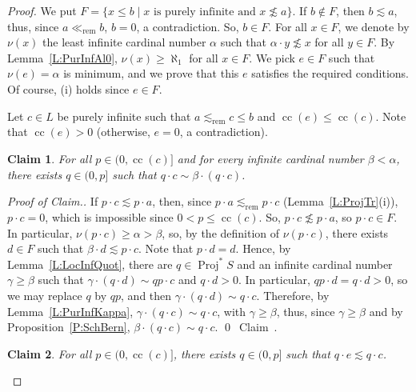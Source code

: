 \documentclass[psamsfonts,reqno]{memo-l}
\theoremstyle{plain}
\newtheorem{claim}{Claim}
\theoremstyle{definition}
\theoremstyle{remark}
\newcommand{\qedc}{{\qed}~{\rm Claim~{\theclaim}.}}
\newenvironment{cproof}
{\begin{proof}[Proof of Claim.]}
{\qedc\renewcommand{\qed}{}\end{proof}}
\numberwithin{equation}{section}
\newcommand{\rem}{\ll_{\mathrm{rem}}}
\newcommand{\srem}{\lesssim_{\mathrm{rem}}}
\DeclareMathOperator{\cc}{cc}
\DeclareMathOperator{\BB}{Proj}
\newcommand{\BBp}[1]{\BB^*{#1}}
\newcommand{\set}[1]{\{#1\}}
\newcommand{\setm}[2]{\set{#1\mid#2}}
\begin{document}
\begin{proof}
We put $F=\setm{x\leq b}{x\text{ is purely infinite and }x\not\lesssim a}$.
If $b\notin F$, then
$b\lesssim a$, thus, since $a\rem b$, $b=0$, a contradiction. So, $b\in F$.
For all $x\in F$, we denote by $\nu(x)$ the least infinite cardinal number
$\alpha$ such that $\alpha\cdot y\not\lesssim x$ for all $y\in F$. By
Lemma~\ref{L:PurInfAl0}, $\nu(x)\geq\aleph_1$ for all $x\in F$. We pick
$e\in F$ such that $\nu(e)=\alpha$ is minimum, and we prove that this $e$
satisfies the required conditions. Of course, (i) holds since $e\in F$.

Let $c\in L$ be purely infinite such that $a\srem c\leq b$ and
$\cc(e)\leq\cc(c)$. Note that $\cc(e)>0$ (otherwise, $e=0$, a contradiction).

\setcounter{claim}{0}
\begin{claim}\label{Cl:qcbetaqc}
For all $p\in(0,\cc(c)]$ and for every infinite cardinal number
$\beta<\alpha$, there exists $q\in(0,p]$ such that
$q\cdot c\sim\beta\cdot(q\cdot c)$.
\end{claim}

\begin{cproof}
If $p\cdot c\lesssim p\cdot a$, then, since $p\cdot a\srem p\cdot c$
(Lemma~\ref{L:ProjTr}(i)), $p\cdot c=0$, which is impossible since
$0<p\leq\cc(c)$. So, $p\cdot c\not\lesssim p\cdot a$, so $p\cdot c\in F$.
In particular, $\nu(p\cdot c)\geq\alpha>\beta$, so, by the definition of
$\nu(p\cdot c)$, there exists $d\in F$ such that
$\beta\cdot d\lesssim p\cdot c$. Note that $p\cdot d=d$.
Hence, by Lemma~\ref{L:LocInfQuot}, there are
$q\in\BBp{S}$\index{pzzrojst@$\BBp{S}$} and an infinite cardinal number
$\gamma\geq\beta$ such that
$\gamma\cdot(q\cdot d)\sim qp\cdot c$ and $q\cdot d>0$.
In particular, $qp\cdot d=q\cdot d>0$, so we may replace $q$ by $qp$,
and then $\gamma\cdot(q\cdot d)\sim q\cdot c$. Therefore, by
Lemma~\ref{L:PurInfKappa}, $\gamma\cdot(q\cdot c)\sim q\cdot c$, with
$\gamma\geq\beta$, thus, since $\gamma\geq\beta$ and by
Proposition~\ref{P:SchBern}, $\beta\cdot(q\cdot c)\sim q\cdot c$.
\end{cproof}

\begin{claim}\label{Cl:qelsmqc}
For all $p\in(0,\cc(c)]$, there exists $q\in(0,p]$ such that
$q\cdot e\lesssim q\cdot c$.
\end{claim}


\end{proof}
\end{document}
